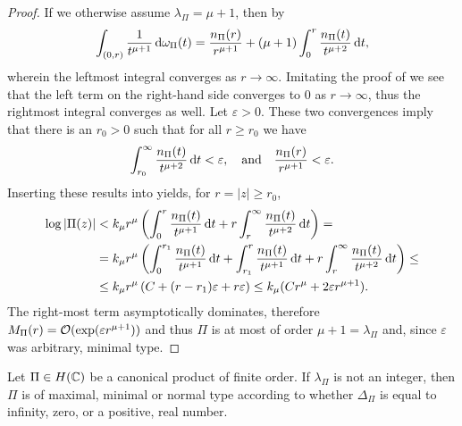 \begin{proof}
    If we otherwise assume $\lambda_\Pi = \mu + 1$, then by 
    $$ \int_{(0, r)} \frac{1}{t^{\mu + 1}} \mathop{}\!\mathrm{d} \omega_\Pi(t) = \frac{n_\Pi(r)}{r^{\mu + 1}} + (\mu + 1) \int_0^r \frac{n_\Pi(t)}{t^{\mu + 2}} \mathop{}\!\mathrm{d} t, $$
    wherein the leftmost integral converges as $r \to \infty$. Imitating the proof of  we see that the left term on the right-hand side converges to $0$ as $r \to \infty$, thus the rightmost integral converges as well. Let $\varepsilon > 0$. These two convergences imply that there is an $r_0 > 0$ such that for all $r \geq r_0$ we have
    $$ \int_{r_0}^\infty \frac{n_\Pi(t)}{t^{\mu + 2}} \mathop{}\!\mathrm{d} t < \varepsilon, \quad \textrm{and} \quad \frac{n_\Pi(r)}{r^{\mu + 1}} < \varepsilon. $$
    Inserting these results into  yields, for $r = \vert z \vert \geq r_0$,
    \begin{align*}
        \log \vert \Pi(z) \vert &< k_\mu r^\mu \left( \int_0^r \frac{n_\Pi(t)}{t^{\mu + 1}} \mathop{}\!\mathrm{d} t + r \int_r^\infty \frac{n_\Pi(t)}{t^{\mu + 2}} \mathop{}\!\mathrm{d} t \right) = \\
        &= k_\mu r^\mu \left( \int_0^{r_1} \frac{n_\Pi(t)}{t^{\mu + 1}} \mathop{}\!\mathrm{d} t + \int_{r_1}^r \frac{n_\Pi(t)}{t^{\mu + 1}} \mathop{}\!\mathrm{d} t + r \int_r^\infty \frac{n_\Pi(t)}{t^{\mu + 2}} \mathop{}\!\mathrm{d} t \right) \leq \\
        &\leq k_\mu r^\mu \left(C + (r - r_1) \varepsilon + r \varepsilon \right) \leq k_\mu (C r^\mu + 2 \varepsilon r^{\mu + 1}).
    \end{align*}
    The right-most term asymptotically dominates, therefore $M_\Pi(r) = \mathcal{O}(\exp(\varepsilon r^{\mu + 1}))$ and thus $\Pi$ is at most of order $\mu + 1 = \lambda_\Pi$ and, since $\varepsilon$ was arbitrary, minimal type.
\end{proof}

\begin{theorem} \label{thm:canonical-product-type-density}
    Let $\Pi \in H(\mathbb{C})$ be a canonical product of finite order. If $\lambda_\Pi$ is not an integer, then $\Pi$ is of maximal, minimal or normal type according to whether $\Delta_\Pi$ is equal to infinity, zero, or a positive, real number.
\end{theorem}

